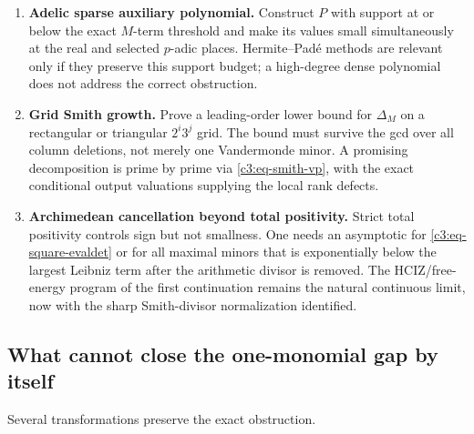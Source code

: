 \documentclass[11pt,oneside]{article}
\theoremstyle{definition}
\theoremstyle{remark}
\begin{document}
\begin{enumerate}
\item \textbf{Adelic sparse auxiliary polynomial.}
Construct $P$ with support at or below the exact $M$-term threshold and make its values small
simultaneously at the real and selected $p$-adic places.  Hermite--Pad\'e methods are relevant
only if they preserve this support budget; a high-degree dense polynomial does not address
the correct obstruction.

\item \textbf{Grid Smith growth.}
Prove a leading-order lower bound for $\Delta_M$ on a rectangular or triangular
$2^i3^j$ grid.  The bound must survive the gcd over all column deletions, not merely one
Vandermonde minor.  A promising decomposition is prime by prime via
\eqref{c3:eq-smith-vp}, with the exact conditional output valuations supplying the local
rank defects.

\item \textbf{Archimedean cancellation beyond total positivity.}
Strict total positivity controls sign but not smallness.  One needs an asymptotic for
\eqref{c3:eq-square-evaldet} or for all maximal minors that is exponentially below the
largest Leibniz term after the arithmetic divisor is removed.  The HCIZ/free-energy program
of the first continuation remains the natural continuous limit, now with the sharp
Smith-divisor normalization identified.
\end{enumerate}

\subsection{What cannot close the one-monomial gap by itself}

Several transformations preserve the exact obstruction.
\end{document}
